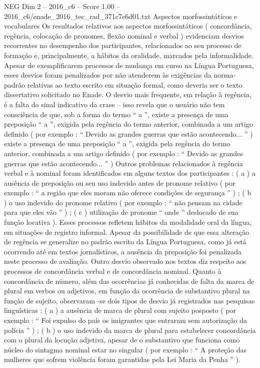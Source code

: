 \begin{textsample}{NEG Dim 2 – 2016\_c6 – Score 1.00 – 2016\_c6/enade\_2016\_tec\_rad\_371c7e6d01.txt}
Aspectos morfossintáticos e vocabulares Os resultados relativos aos aspectos morfossintáticos ( concordância, regência, colocação de pronomes, flexão nominal e verbal ) evidenciam desvios recorrentes no desempenho dos participantes, relacionados ao seu processo de formação e, principalmente, a hábitos da oralidade, marcados pela informalidade.
Apesar de exemplificarem processos de mudança em curso na Língua Portuguesa, esses desvios foram penalizados por não atenderem às exigências da norma-padrão relativas ao texto escrito em situação formal, como deveria ser o texto dissertativo solicitado no Enade.
O desvio mais frequente, em relação à regência, é a falta do sinal indicativo da crase – isso revela que o usuário não tem consciência de que, sob a forma do termo “ a ”, existe a presença de uma preposição “ a ”, exigida pela regência do termo anterior, combinada a um artigo definido ( por exemplo : “ Devido as grandes guerras que estão acontecendo... ” ) existe a presença de uma preposição “ a ”, exigida pela regência do termo anterior, combinada a um artigo definido ( por exemplo : “ Devido as grandes guerras que estão acontecendo... ” ) Outros problemas relacionados à regência verbal e à nominal foram identificados em alguns textos dos participantes : ( a ) a ausência de preposição ou seu uso indevido antes de pronome relativo ( por exemplo : “ a região que eles moram não oferece condições de segurança ” ) ; ( b ) o uso indevido do pronome relativo ( por exemplo : “ não pensam na cidade para que eles vão ” ) ; ( c ) utilização de pronome “ onde ” deslocado de sua função locativa ).
Esses processos refletem hábitos da modalidade oral da língua, em situações de registro informal.
Apesar da possibilidade de que essa alteração de regência se generalize no padrão escrito da Língua Portuguesa, como já está ocorrendo até em textos jornalísticos, a ausência da preposição foi penalizada neste processo de avaliação.
Outro desvio observado nos textos diz respeito aos processos de concordância verbal e de concordância nominal.
Quanto à concordância de número, além das ocorrências já conhecidas de falta da marca de plural em verbos ou adjetivos, em função da ocorrência de substantivo plural na função de sujeito, observaram -se dois tipos de desvio já registrados nas pesquisas linguísticas : ( a ) a ausência de marca de plural com sujeito posposto ( por exemplo : “ Foi expulso do país os imigrantes que entraram sem autorização da polícia ” ) ; ( b ) o uso indevido da marca de plural para estabelecer concordância com o plural da locução adjetiva, apesar de o substantivo que funciona como núcleo do sintagma nominal estar no singular ( por exemplo : “ A proteção das mulheres que sofrem violência foram garantidas pela Lei Maria da Penha ” ).

\end{textsample}
